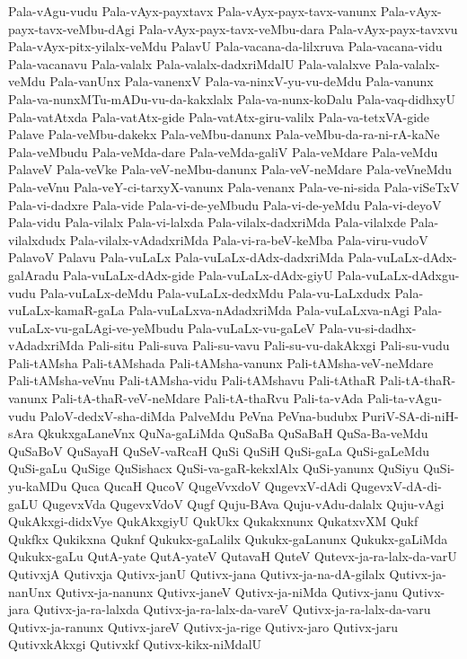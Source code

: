 {Pala-vAgu-vudu
Pala-vAyx-payxtavx
Pala-vAyx-payx-tavx-vanunx
Pala-vAyx-payx-tavx-veMbu-dAgi
Pala-vAyx-payx-tavx-veMbu-dara
Pala-vAyx-payx-tavxvu
Pala-vAyx-pitx-yilalx-veMdu
PalavU
Pala-vacana-da-lilxruva
Pala-vacana-vidu
Pala-vacanavu
Pala-valalx
Pala-valalx-dadxriMdalU
Pala-valalxve
Pala-valalx-veMdu
Pala-vanUnx
Pala-vanenxV
Pala-va-ninxV-yu-vu-deMdu
Pala-vanunx
Pala-va-nunxMTu-mADu-vu-da-kakxlalx
Pala-va-nunx-koDalu
Pala-vaq-didhxyU
Pala-vatAtxda
Pala-vatAtx-gide
Pala-vatAtx-giru-valilx
Pala-va-tetxVA-gide
Palave
Pala-veMbu-dakekx
Pala-veMbu-danunx
Pala-veMbu-da-ra-ni-rA-kaNe
Pala-veMbudu
Pala-veMda-dare
Pala-veMda-galiV
Pala-veMdare
Pala-veMdu
PalaveV
Pala-veVke
Pala-veV-neMbu-danunx
Pala-veV-neMdare
Pala-veVneMdu
Pala-veVnu
Pala-veY-ci-tarxyX-vanunx
Pala-venanx
Pala-ve-ni-sida
Pala-viSeTxV
Pala-vi-dadxre
Pala-vide
Pala-vi-de-yeMbudu
Pala-vi-de-yeMdu
Pala-vi-deyoV
Pala-vidu
Pala-vilalx
Pala-vi-lalxda
Pala-vilalx-dadxriMda
Pala-vilalxde
Pala-vilalxdudx
Pala-vilalx-vAdadxriMda
Pala-vi-ra-beV-keMba
Pala-viru-vudoV
PalavoV
Palavu
Pala-vuLaLx
Pala-vuLaLx-dAdx-dadxriMda
Pala-vuLaLx-dAdx-galAradu
Pala-vuLaLx-dAdx-gide
Pala-vuLaLx-dAdx-giyU
Pala-vuLaLx-dAdxgu-vudu
Pala-vuLaLx-deMdu
Pala-vuLaLx-dedxMdu
Pala-vu-LaLxdudx
Pala-vuLaLx-kamaR-gaLa
Pala-vuLaLxva-nAdadxriMda
Pala-vuLaLxva-nAgi
Pala-vuLaLx-vu-gaLAgi-ve-yeMbudu
Pala-vuLaLx-vu-gaLeV
Pala-vu-si-dadhx-vAdadxriMda
Pali-situ
Pali-suva
Pali-su-vavu
Pali-su-vu-dakAkxgi
Pali-su-vudu
Pali-tAMsha
Pali-tAMshada
Pali-tAMsha-vanunx
Pali-tAMsha-veV-neMdare
Pali-tAMsha-veVnu
Pali-tAMsha-vidu
Pali-tAMshavu
Pali-tAthaR
Pali-tA-thaR-vanunx
Pali-tA-thaR-veV-neMdare
Pali-tA-thaRvu
Pali-ta-vAda
Pali-ta-vAgu-vudu
PaloV-dedxV-sha-diMda
PalveMdu
PeVna
PeVna-budubx
PuriV-SA-di-niH-sAra
QkukxgaLaneVnx
QuNa-gaLiMda
QuSaBa
QuSaBaH
QuSa-Ba-veMdu
QuSaBoV
QuSayaH
QuSeV-vaRcaH
QuSi
QuSiH
QuSi-gaLa
QuSi-gaLeMdu
QuSi-gaLu
QuSige
QuSishacx
QuSi-va-gaR-kekxlAlx
QuSi-yanunx
QuSiyu
QuSi-yu-kaMDu
Quca
QucaH
QucoV
QugeVvxdoV
QugevxV-dAdi
QugevxV-dA-di-gaLU
QugevxVda
QugevxVdoV
Qugf
Quju-BAva
Quju-vAdu-dalalx
Quju-vAgi
QukAkxgi-didxVye
QukAkxgiyU
QukUkx
Qukakxnunx
QukatxvXM
Qukf
Qukfkx
Qukikxna
Quknf
Qukukx-gaLalilx
Qukukx-gaLanunx
Qukukx-gaLiMda
Qukukx-gaLu
QutA-yate
QutA-yateV
QutavaH
QuteV
Qutevx-ja-ra-lalx-da-varU
QutivxjA
Qutivxja
Qutivx-janU
Qutivx-jana
Qutivx-ja-na-dA-gilalx
Qutivx-ja-nanUnx
Qutivx-ja-nanunx
Qutivx-janeV
Qutivx-ja-niMda
Qutivx-janu
Qutivx-jara
Qutivx-ja-ra-lalxda
Qutivx-ja-ra-lalx-da-vareV
Qutivx-ja-ra-lalx-da-varu
Qutivx-ja-ranunx
Qutivx-jareV
Qutivx-ja-rige
Qutivx-jaro
Qutivx-jaru
QutivxkAkxgi
Qutivxkf
Qutivx-kikx-niMdalU
}
